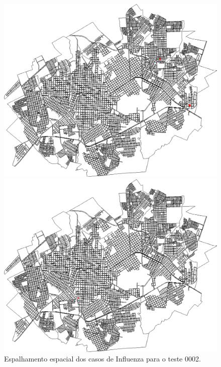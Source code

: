\begin{figure}[H]
\begin{minipage}{.5\textwidth}
    \captionsetup{labelformat=empty}
  \end{minipage}
  \begin{minipage}{.5\textwidth}
    \centering
    \includegraphics[width=1.0\textwidth]{Figuras/Resultados/0002/Saidas_GPU_BIT/MonteCarlo_0/Simulacao_0/Casos/00160.png}
    \captionsetup{labelformat=empty}
  \end{minipage}%
  \begin{minipage}{.5\textwidth}
    \centering
    \includegraphics[width=1.0\textwidth]{Figuras/Resultados/0002/Saidas_GPU_BIT/MonteCarlo_0/Simulacao_0/Casos/00200.png}
    \captionsetup{labelformat=empty}
  \end{minipage}
  \caption{Espalhamento espacial dos casos de Influenza para o teste 0002.}
  \label{fig:casos_0002}
\end{figure}

